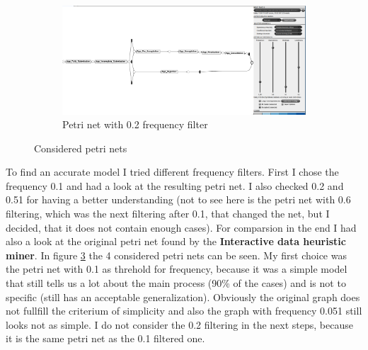 \begin{figure}[!htbp]
\begin{subfigure}{.4\textwidth}
  \label{fig:APP_DFG0-1}
\end{subfigure}
\begin{subfigure}{.4\textwidth}
  \centering
  \includegraphics[width=\linewidth]{App_DirectlyFollowedFreq0-2.PNG}
  \caption{Petri net with 0.2 frequency filter}
  \label{fig:APP_DFG0-2}
\end{subfigure}
\caption{Considered petri nets}
\label{fig:App_Direct}
\end{figure}

To find an accurate model I tried different frequency filters. First I chose the frequency 0.1 and had a look at the resulting petri net. I also checked 0.2 and 0.51 for having a better understanding (not to see here is the petri net with 0.6 filtering, which was the next filtering after 0.1, that changed the net, but I decided, that it does not contain enough cases). For comparsion in the end I had also a look at the original petri net found by the \textbf{Interactive data heuristic miner}. In figure \ref{fig:App_Direct} the 4 considered petri nets can be seen. My first choice was the petri net with 0.1 as threhold for frequency, because it was a simple model that still tells us a lot about the main process (90\% of the cases) and is not to specific (still has an acceptable generalization). Obviously the original graph does not fullfill the criterium of simplicity and also the graph with frequency 0.051 still looks not as simple. I do not consider the 0.2 filtering in the next steps, because it is the same petri net as the 0.1 filtered one.

